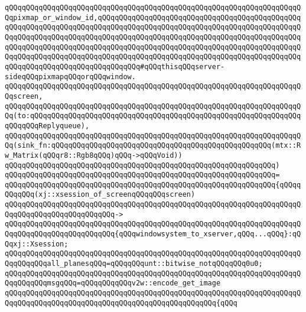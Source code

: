 \verb|qQQqqQQqqQQqqQQqqQQqqQQqqQQqqQQqqQQqqQQqqQQqqQQqqQQqqQQqqQQqqQQqqQQqqQQqpixmap_or_window_id,qQQqqQQqqQQqqQQqqQQqqQQqqQQqqQQqqQQqqQQqqQQqqQQqqQQqqQQqqQQqqQQqqQQqqQQqqQQqqQQqqQQqqQQqqQQqqQQqqQQqqQQqqQQqqQQqqQQqqQQqqQQqqQQqqQQqqQQqqQQqqQQqqQQqqQQqqQQqqQQqqQQqqQQqqQQqqQQqqQQqqQQqqQQqqQQqqQQqqQQqqQQqqQQqqQQqqQQqqQQqqQQqqQQqqQQqqQQqqQQqqQQqqQQqqQQqqQQqqQQqqQQqqQQqqQQqqQQqqQQqqQQqqQQqqQQqqQQqqQQqqQQqqQQqqQQqqQQqqQQqqQQqqQQqqQQqqQQqqQQqqQQqqQQqqQQqqQQqqQQq#qQQqthisqQQqserver-sideqQQqpixmapqQQqorqQQqwindow.|\newline
\verb|qQQqqQQqqQQqqQQqqQQqqQQqqQQqqQQqqQQqqQQqqQQqqQQqqQQqqQQqqQQqqQQqqQQqqQQqscreen,|\newline
\verb|qQQqqQQqqQQqqQQqqQQqqQQqqQQqqQQqqQQqqQQqqQQqqQQqqQQqqQQqqQQqqQQqqQQqqQQq(to:qQQqqQQqqQQqqQQqqQQqqQQqqQQqqQQqqQQqqQQqqQQqqQQqqQQqqQQqqQQqqQQqqQQqqQQqReplyqueue),|\newline
\verb|qQQqqQQqqQQqqQQqqQQqqQQqqQQqqQQqqQQqqQQqqQQqqQQqqQQqqQQqqQQqqQQqqQQqqQQq(sink_fn:qQQqqQQqqQQqqQQqqQQqqQQqqQQqqQQqqQQqqQQqqQQqqQQqqQQq(mtx::Rw_Matrix(qQQqr8::Rgb8qQQq)qQQq->qQQqVoid))|\newline
\verb|qQQqqQQqqQQqqQQqqQQqqQQqqQQqqQQqqQQqqQQqqQQqqQQqqQQqqQQqqQQqqQQq)|\newline
\verb|qQQqqQQqqQQqqQQqqQQqqQQqqQQqqQQqqQQqqQQqqQQqqQQqqQQqqQQqqQQqqQQq=|\newline
\verb|qQQqqQQqqQQqqQQqqQQqqQQqqQQqqQQqqQQqqQQqqQQqqQQqqQQqqQQqqQQqqQQq{qQQqqQQqqQQq(xj::xsession_of_screenqQQqqQQqscreen)|\newline
\verb|qQQqqQQqqQQqqQQqqQQqqQQqqQQqqQQqqQQqqQQqqQQqqQQqqQQqqQQqqQQqqQQqqQQqqQQqqQQqqQQqqQQqqQQqqQQqqQQq->|\newline
\verb|qQQqqQQqqQQqqQQqqQQqqQQqqQQqqQQqqQQqqQQqqQQqqQQqqQQqqQQqqQQqqQQqqQQqqQQqqQQqqQQqqQQqqQQqqQQqqQQq{qQQqwindowsystem_to_xserver,qQQq...qQQq}:qQQqxj::Xsession;|\newline
\newline
\newline
\verb|qQQqqQQqqQQqqQQqqQQqqQQqqQQqqQQqqQQqqQQqqQQqqQQqqQQqqQQqqQQqqQQqqQQqqQQqqQQqqQQqall_planesqQQq=qQQqqQQqunt::bitwise_notqQQqqQQq0u0;|\newline
\newline
\verb|qQQqqQQqqQQqqQQqqQQqqQQqqQQqqQQqqQQqqQQqqQQqqQQqqQQqqQQqqQQqqQQqqQQqqQQqqQQqqQQqmsgqQQq=qQQqqQQqqQQqv2w::encode_get_image|\newline
\verb|qQQqqQQqqQQqqQQqqQQqqQQqqQQqqQQqqQQqqQQqqQQqqQQqqQQqqQQqqQQqqQQqqQQqqQQqqQQqqQQqqQQqqQQqqQQqqQQqqQQqqQQqqQQqqQQqqQQqqQQq{qQQq|\newline
